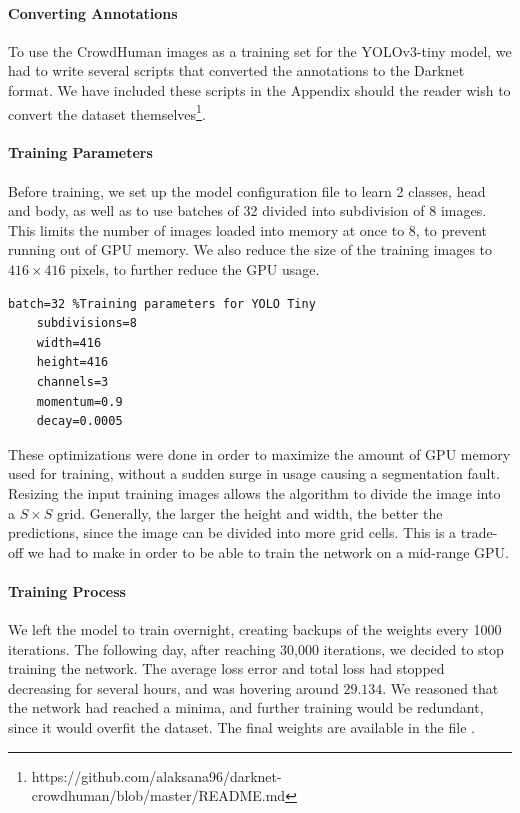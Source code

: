 \paragraph{Converting Annotations} To use the CrowdHuman images as a training set for the YOLOv3-tiny model, we had to write several scripts that converted the annotations to the Darknet format. We have included these scripts in the Appendix should the reader wish to convert the dataset themselves\footnote{https://github.com/alaksana96/darknet-crowdhuman/blob/master/README.md}.

\paragraph{Training Parameters} Before training, we set up the model configuration file to learn 2 classes, head and body, as well as to use batches of 32 divided into subdivision of 8 images. This limits the number of images loaded into memory at once to 8, to prevent running out of GPU memory. We also reduce the size of the training images to $416\times 416$ pixels, to further reduce the GPU usage. \\

\begin{lstlisting}[language=Mymatlab,caption={Training parameters}]
	batch=32 %Training parameters for YOLO Tiny
	subdivisions=8
	width=416
	height=416
	channels=3
	momentum=0.9
	decay=0.0005
\end{lstlisting}

These optimizations were done in order to maximize the amount of GPU memory used for training, without a sudden surge in usage causing a segmentation fault. Resizing the input training images allows the algorithm to divide the image into a $S\times S$ grid. Generally, the larger the height and width, the better the predictions, since the image can be divided into more grid cells. This is a trade-off we had to make in order to be able to train the network on a mid-range GPU.

\paragraph{Training Process} We left the model to train overnight, creating backups of the weights every 1000 iterations. The following day, after reaching 30,000 iterations, we decided to stop training the network. The average loss error and total loss had stopped decreasing for several hours, and was hovering around $29.134$. We reasoned that the network had reached a minima, and further training would be redundant, since it would overfit the dataset. The final weights are available in the file  .

